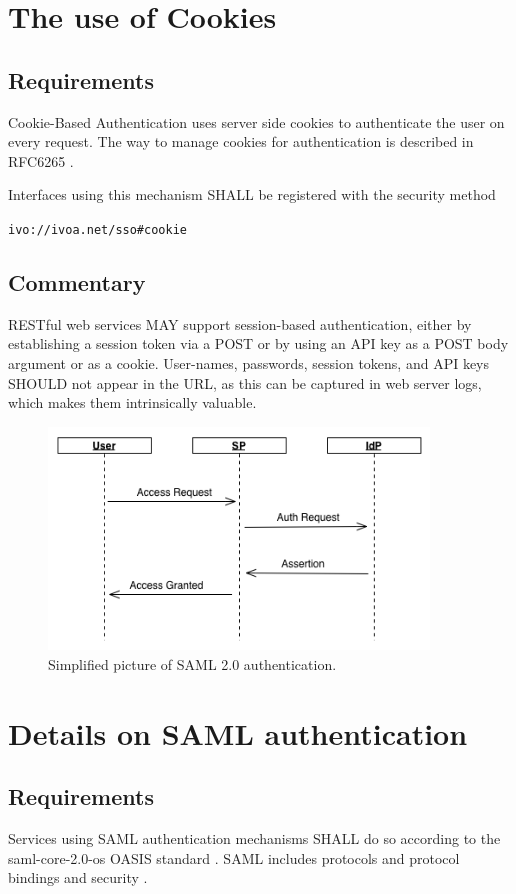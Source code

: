 \documentclass[11pt,a4paper]{ivoa}
\begin{document}
{{{\section{The use of Cookies}
\subsection{Requirements}
Cookie-Based Authentication uses server side cookies to authenticate the user on every request.
The way to manage  cookies for authentication is described in RFC6265 \citep{std:RFC6265}.

Interfaces using this mechanism SHALL  be registered with the security method

\texttt{ivo://ivoa.net/sso\#cookie}


\subsection{Commentary}
RESTful web services MAY support  session-based authentication, either by establishing a session token via a POST or
by using an API key as a POST body argument or as a cookie.
User-names, passwords, session tokens, and API keys SHOULD not appear in the URL,
as this can be captured in web server logs, which makes them intrinsically valuable.
\begin{figure}
\centering
\includegraphics[width=0.9\textwidth]{SSO_image002.png}
\caption{Simplified picture of SAML 2.0 authentication.}
\label{fig:saml}
\end{figure}

\section{Details on SAML authentication}
\subsection{Requirements}
Services using SAML authentication mechanisms SHALL do so according to the
saml-core-2.0-os OASIS standard \citep{std:SAML}.
SAML includes protocols and protocol bindings and security \citep{std:SAMLB}.

}}}
\end{document}

